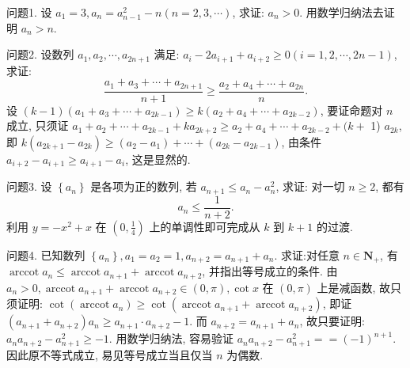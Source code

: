
问题1. 设 $a_1=3, a_n=a_{n-1}^2-n(n=2,3, \cdots)$, 求证: $a_n>0$.
用数学归纳法去证明 $a_n>n$.



问题2. 设数列 $a_1, a_2, \cdots, a_{2 n+1}$ 满足: $a_i-2 a_{i+1}+a_{i+2} \geqslant 0(i=1,2, \cdots, 2 n-1)$, 求证:
$$
\frac{a_1+a_3+\cdots+a_{2 n+1}}{n+1} \geqslant \frac{a_2+a_4+\cdots+a_{2 n}}{n} .
$$
设 $(k-1)\left(a_1+a_3+\cdots+a_{2 k-1}\right) \geqslant k\left(a_2+a_4+\cdots+a_{2 k-2}\right)$, 要证命题对 $n$ 成立, 只须证 $a_1+a_2+\cdots+a_{2 k-1}+k a_{2 k+2} \geqslant a_2+a_4+\cdots+a_{2 k-2}+(k+$ 1) $a_{2 k}$, 即 $k\left(a_{2 k+1}-a_{2 k}\right) \geqslant\left(a_2-a_1\right)+\cdots+\left(a_{2 k}-a_{2 k-1}\right)$, 由条件 $a_{i+2}-a_{i+1} \geqslant a_{i+1}-a_i$, 这是显然的.



问题3. 设 $\left\{a_n\right\}$ 是各项为正的数列, 若 $a_{n+1} \leqslant a_n-a_n^2$, 求证: 对一切 $n \geqslant 2$, 都有
$$
a_n \leqslant \frac{1}{n+2} .
$$
利用 $y=-x^2+x$ 在 $\left(0, \frac{1}{4}\right)$ 上的单调性即可完成从 $k$ 到 $k+1$ 的过渡.



问题4. 已知数列 $\left\{a_n\right\}, a_1=a_2=1, a_{n+2}=a_{n+1}+a_n$. 求证:对任意 $n \in \mathbf{N}_{+}$, 有 $\operatorname{arccot} a_n \leqslant \operatorname{arccot} a_{n+1}+\operatorname{arccot} a_{n+2}$,
并指出等号成立的条件.
由 $a_n>0, \operatorname{arccot} a_{n+1}+\operatorname{arccot} a_{n+2} \in(0, \pi), \cot x$ 在 $(0, \pi)$ 上是减函数, 故只须证明: $\cot \left(\operatorname{arccot} a_n\right) \geqslant \cot \left(\operatorname{arccot} a_{n+1}+\operatorname{arccot} a_{n+2}\right)$, 即证 $\left(a_{n+1}+\right. \left.a_{n+2}\right) a_n \geqslant a_{n+1} \cdot a_{n+2}-1$.
而 $a_{n+2}=a_{n+1}+a_n$, 故只要证明: $a_n a_{n+2}-a_{n+1}^2 \geqslant-1$.
用数学归纳法, 容易验证 $a_n a_{n+2}-a_{n+1}^2==(-1)^{n+1}$. 因此原不等式成立, 易见等号成立当且仅当 $n$ 为偶数.



